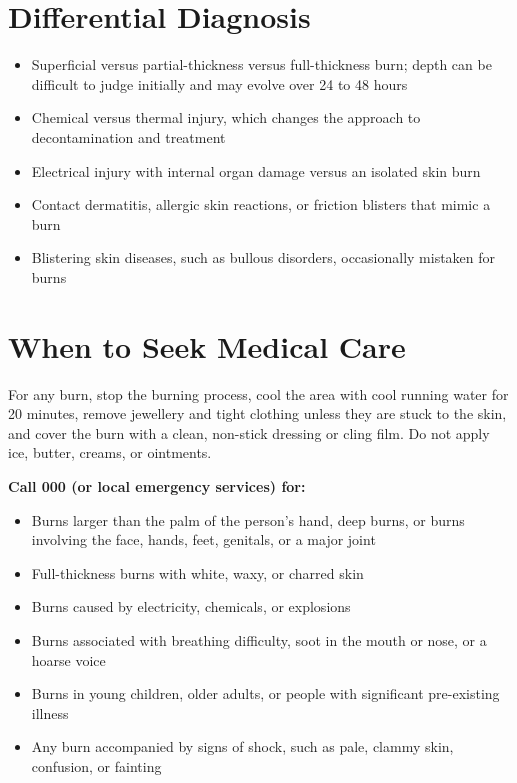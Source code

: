 \section*{Differential Diagnosis}
\begin{itemize}
    \item Superficial versus partial-thickness versus full-thickness burn; depth can be difficult to judge initially and may evolve over 24 to 48 hours
    \item Chemical versus thermal injury, which changes the approach to decontamination and treatment
    \item Electrical injury with internal organ damage versus an isolated skin burn
    \item Contact dermatitis, allergic skin reactions, or friction blisters that mimic a burn
    \item Blistering skin diseases, such as bullous disorders, occasionally mistaken for burns
\end{itemize}

\section*{When to Seek Medical Care}
For any burn, stop the burning process, cool the area with cool running water for 20 minutes, remove jewellery and tight clothing unless they are stuck to the skin, and cover the burn with a clean, non-stick dressing or cling film. Do not apply ice, butter, creams, or ointments.

\textbf{Call 000 (or local emergency services) for:}
\begin{itemize}
    \item Burns larger than the palm of the person's hand, deep burns, or burns involving the face, hands, feet, genitals, or a major joint
    \item Full-thickness burns with white, waxy, or charred skin
    \item Burns caused by electricity, chemicals, or explosions
    \item Burns associated with breathing difficulty, soot in the mouth or nose, or a hoarse voice
    \item Burns in young children, older adults, or people with significant pre-existing illness
    \item Any burn accompanied by signs of shock, such as pale, clammy skin, confusion, or fainting
\end{itemize}

